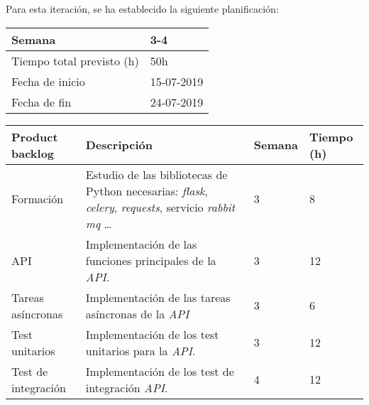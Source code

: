 Para esta iteración, se ha establecido la siguiente planificación:

\begin{table}[h!]
\centering
\begin{tabular}{|p{5cm}|p{4cm}|}
 \hline
	\cellcolor[gray]{0.9} Semana  & 3-4 \\ \hline
	\cellcolor[gray]{0.9} Tiempo total previsto (h)  & 50h \\ \hline
	\cellcolor[gray]{0.9} Fecha de inicio  & 15-07-2019 \\ \hline
	\cellcolor[gray]{0.9} Fecha de fin  & 24-07-2019 \\ \hline
		
\end{tabular}
\end{table}

\begin{table}[h!]
\begin{tabular}{|p{4cm}|p{7.2cm}|p{1.3cm}|p{2.1cm}|}
\hline
\rowcolor[HTML]{9B9B9B} 
{\color[HTML]{FFFFFF} Product backlog} & {\color[HTML]{FFFFFF} Descripción}                                  & {\color[HTML]{FFFFFF} Semana} & {\color[HTML]{FFFFFF}Tiempo (h)} \\ \hline
Formación                             & Estudio de las bibliotecas de Python necesarias: \textit{flask}, \textit{celery}, \textit{requests}, servicio \textit{rabbit mq} \ldots
                                        & 3                             & 8                                   \\ \hline
API                        & Implementación de las funciones principales de la \textit{API}.
                                  & 3                             & 12                                  \\ \hline
Tareas asíncronas                         & Implementación de las tareas asíncronas de la \textit{API}
          & 3                             & 6                                   \\ \hline
Test unitarios                         & Implementación de los test unitarios para la \textit{API}.
          & 3                             & 12                                   \\ \hline

Test de integración                         & Implementación de los test de integración \textit{API}. & 4 & 12 \\ \hline  

\end{tabular}
\end{table}

